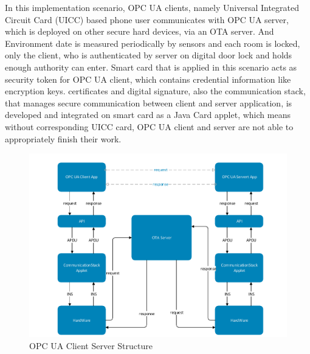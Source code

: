 \documentclass[]{llncs}
\begin{document}
In this implementation scenario, OPC UA clients, namely Universal Integrated Circuit Card (UICC)  based phone user communicates with OPC UA server, which is deployed on other secure hard devices, via an OTA server.  And Environment date is measured periodically by sensors and each room is locked, only the client, who is authenticated by server on digital door lock and holds enough authority can enter. Smart card that is applied in this scenario acts as security token for OPC UA client, which contains credential information like encryption keys. certificates and digital signature, also the communication stack, that manages secure  communication between client and server application, is developed and integrated on smart card as  a Java Card applet, which means without corresponding UICC card, OPC UA client and server are not able to appropriately finish their work.
 \begin{figure}[ht]

	\centering
	\includegraphics[width=1.1\textwidth]{csoverview}
		\caption[ ]{OPC UA Client Server Structure}
	\label{fig:softwareStructure}
\end{figure}
\end{document}
